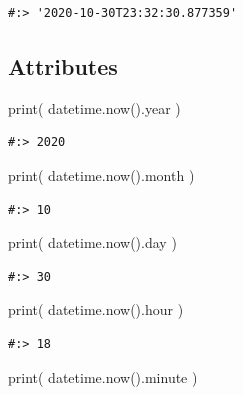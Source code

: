 \documentclass[
]{book}
\newenvironment{Shaded}{\begin{snugshade}}{\end{snugshade}}
\newcommand{\BuiltInTok}[1]{#1}
\newcommand{\NormalTok}[1]{#1}
\begin{document}
\begin{verbatim}
#:> '2020-10-30T23:32:30.877359'
\end{verbatim}

\hypertarget{attributes-1}{%
\subsection{Attributes}\label{attributes-1}}

\begin{Shaded}
\begin{Highlighting}[]
\BuiltInTok{print}\NormalTok{( datetime.now().year )}
\end{Highlighting}
\end{Shaded}

\begin{verbatim}
#:> 2020
\end{verbatim}

\begin{Shaded}
\begin{Highlighting}[]
\BuiltInTok{print}\NormalTok{( datetime.now().month )}
\end{Highlighting}
\end{Shaded}

\begin{verbatim}
#:> 10
\end{verbatim}

\begin{Shaded}
\begin{Highlighting}[]
\BuiltInTok{print}\NormalTok{( datetime.now().day )}
\end{Highlighting}
\end{Shaded}

\begin{verbatim}
#:> 30
\end{verbatim}

\begin{Shaded}
\begin{Highlighting}[]
\BuiltInTok{print}\NormalTok{( datetime.now().hour )}
\end{Highlighting}
\end{Shaded}

\begin{verbatim}
#:> 18
\end{verbatim}

\begin{Shaded}
\begin{Highlighting}[]
\BuiltInTok{print}\NormalTok{( datetime.now().minute )}
\end{Highlighting}
\end{Shaded}
\end{document}
